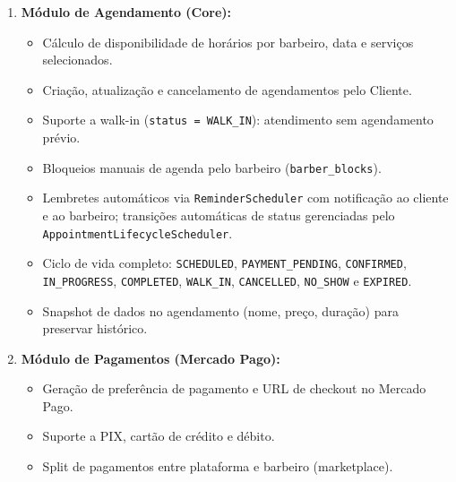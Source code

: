 \documentclass[
    12pt, 
    a4paper, 
    oneside, 
    chapter=TITLE, 
    section=TITLE
]{abntex2}
\begin{document}
\begin{enumerate}
\begin{itemize}
            \item Barbeiro pode solicitar entrada em uma barbearia (tipo \texttt{JOIN}) ou receber convite do dono (tipo \texttt{INVITE}).
            \item Barbeiro Owner pode visualizar, aprovar ou rejeitar solicitações de entrada pendentes.
            \item Barbeiro pode definir blocos de horário de trabalho por dia da semana (\texttt{barber\_work\_blocks}).
            \item Barbeiro pode vincular ao seu perfil quais serviços da barbearia está apto a realizar.
            \item Barbeiro Owner pode remover barbeiros da equipe.
        \end{itemize}
    \item \textbf{Módulo de Agendamento (Core):}
        \begin{itemize}
            \item Cálculo de disponibilidade de horários por barbeiro, data e serviços selecionados.
            \item Criação, atualização e cancelamento de agendamentos pelo Cliente.
            \item Suporte a walk-in (\texttt{status = WALK\_IN}): atendimento sem agendamento prévio.
            \item Bloqueios manuais de agenda pelo barbeiro (\texttt{barber\_blocks}).
            \item Lembretes automáticos via \texttt{ReminderScheduler} com notificação ao cliente e ao barbeiro; transições automáticas de status gerenciadas pelo \texttt{AppointmentLifecycleScheduler}.
            \item Ciclo de vida completo: \texttt{SCHEDULED}, \texttt{PAYMENT\_PENDING}, \texttt{CONFIRMED}, \texttt{IN\_PROGRESS}, \texttt{COMPLETED}, \texttt{WALK\_IN}, \texttt{CANCELLED}, \texttt{NO\_SHOW} e \texttt{EXPIRED}.
            \item Snapshot de dados no agendamento (nome, preço, duração) para preservar histórico.
        \end{itemize}
    \item \textbf{Módulo de Pagamentos (Mercado Pago):}
        \begin{itemize}
            \item Geração de preferência de pagamento e URL de checkout no Mercado Pago.
            \item Suporte a PIX, cartão de crédito e débito.
            \item Split de pagamentos entre plataforma e barbeiro (marketplace).

\end{itemize}
\end{enumerate}
\end{document}
